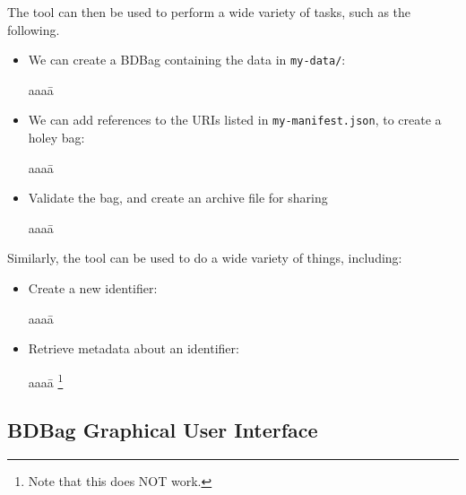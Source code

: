 \documentclass[11pt]{article}
\begin{document}
\noindent
The  tool can then be used to perform a wide variety of tasks, such as the following.
\begin{itemize}
\item
We can create a BDBag containing the data in \texttt{my-data/}:
\vspace{-2ex}
\begin{tabbing}
aaaa\=\kill
\>
\end{tabbing}

\item
We can add references to the URIs listed in \texttt{my-manifest.json}, to create a holey bag:
\vspace{-2ex}
\begin{tabbing}
aaaa\=\kill
\>
\end{tabbing}

\item
Validate the bag, and create an archive file for sharing
\vspace{-2ex}
\begin{tabbing}
aaaa\=\kill
\>
\end{tabbing}

\end{itemize}

\noindent
Similarly, the  tool can be used to do a wide variety of things, including:

\begin{itemize}
\item
Create a new identifier:
\vspace{-2ex}
\begin{tabbing}
aaaa\=\kill
\>
\end{tabbing}

\item
Retrieve metadata about an identifier:
\vspace{-2ex}
\begin{tabbing}
aaaa\=\kill
\>\footnote{Note that this does NOT work.}
\end{tabbing}
\end{itemize}

\subsection{BDBag Graphical User Interface}
\end{document}
